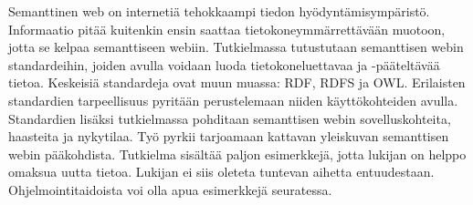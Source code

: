 \documentclass[finnish, 12pt, a4paper, elec, utf8, pdfa, online]{aaltothesis}
\date{24.4.2018}
\begin{document}
\makecoverpage

\makecopyrightpage

\begin{abstractpage}[finnish]
Semanttinen web on internetiä tehokkaampi tiedon hyödyntämisympäristö. Informaatio pitää kuitenkin ensin saattaa tietokoneymmärrettävään muotoon, jotta se kelpaa semanttiseen webiin. Tutkielmassa tutustutaan semanttisen webin standardeihin, joiden avulla voidaan luoda tietokoneluettavaa ja -pääteltävää tietoa. Keskeisiä standardeja ovat muun muassa: RDF, RDFS ja OWL. Erilaisten standardien tarpeellisuus pyritään perustelemaan niiden käyttökohteiden avulla. Standardien lisäksi tutkielmassa pohditaan semanttisen webin sovelluskohteita, haasteita ja nykytilaa. Työ pyrkii tarjoamaan kattavan yleiskuvan semanttisen webin pääkohdista. Tutkielma sisältää paljon esimerkkejä, jotta lukijan on helppo omaksua uutta tietoa. Lukijan ei siis oleteta tuntevan aihetta entuudestaan. Ohjelmointitaidoista voi olla apua esimerkkejä seuratessa.
\end{abstractpage}


\newpage







\end{document}
